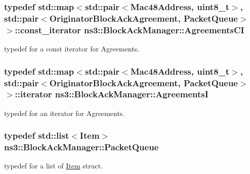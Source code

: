 \subsubsection[{\texorpdfstring{Agreements\+CI}{AgreementsCI}}]{\setlength{\rightskip}{0pt plus 5cm}typedef std\+::map$<$std\+::pair$<${\bf Mac48\+Address}, uint8\+\_\+t$>$, std\+::pair$<${\bf Originator\+Block\+Ack\+Agreement}, {\bf Packet\+Queue}$>$ $>$\+::const\+\_\+iterator {\bf ns3\+::\+Block\+Ack\+Manager\+::\+Agreements\+CI}\hspace{0.3cm}{\ttfamily [private]}}\hypertarget{classns3_1_1BlockAckManager_a69f7b0d583f5a24ddcfce51260a56dae}{}\label{classns3_1_1BlockAckManager_a69f7b0d583f5a24ddcfce51260a56dae}
typedef for a const iterator for Agreements. 
\subsubsection[{\texorpdfstring{AgreementsI}{AgreementsI}}]{\setlength{\rightskip}{0pt plus 5cm}typedef std\+::map$<$std\+::pair$<${\bf Mac48\+Address}, uint8\+\_\+t$>$, std\+::pair$<${\bf Originator\+Block\+Ack\+Agreement}, {\bf Packet\+Queue}$>$ $>$\+::iterator {\bf ns3\+::\+Block\+Ack\+Manager\+::\+AgreementsI}\hspace{0.3cm}{\ttfamily [private]}}\hypertarget{classns3_1_1BlockAckManager_acbd1cf7c5f3487150955c3a4c9d04102}{}\label{classns3_1_1BlockAckManager_acbd1cf7c5f3487150955c3a4c9d04102}
typedef for an iterator for Agreements. 
\subsubsection[{\texorpdfstring{Packet\+Queue}{PacketQueue}}]{\setlength{\rightskip}{0pt plus 5cm}typedef {\bf std\+::list}$<${\bf Item}$>$ {\bf ns3\+::\+Block\+Ack\+Manager\+::\+Packet\+Queue}\hspace{0.3cm}{\ttfamily [private]}}\hypertarget{classns3_1_1BlockAckManager_a19b26a2c6037c95267b6f1905feb07a5}{}\label{classns3_1_1BlockAckManager_a19b26a2c6037c95267b6f1905feb07a5}
typedef for a list of \hyperlink{structns3_1_1BlockAckManager_1_1Item}{Item} struct. 
